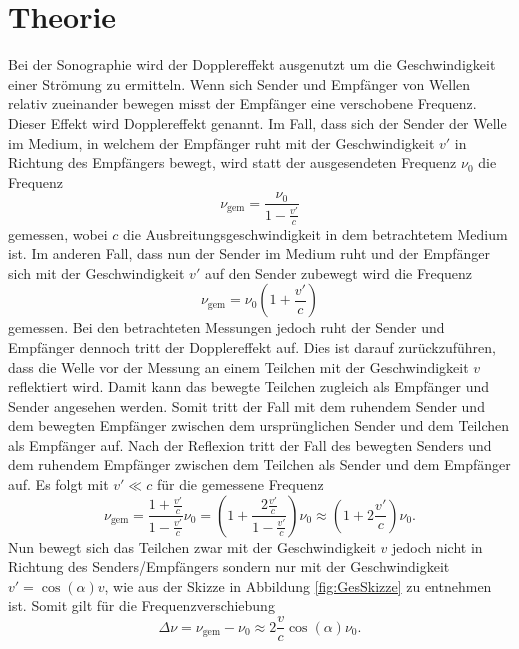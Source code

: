 
\section{Theorie}
\label{sec:Theorie}

Bei der Sonographie wird der Dopplereffekt ausgenutzt um die Geschwindigkeit einer Strömung zu ermitteln.
Wenn sich Sender und Empfänger von Wellen relativ zueinander bewegen misst der Empfänger eine verschobene Frequenz. Dieser Effekt wird Dopplereffekt genannt. Im Fall, dass sich der Sender der Welle im Medium, in welchem der Empfänger ruht mit der Geschwindigkeit $v'$ in Richtung des Empfängers bewegt, wird statt der ausgesendeten Frequenz $\nu_0$ die Frequenz
\begin{equation}
	\nu_\text{gem}=\frac{\nu_0}{1-\frac{v'}{c}}
\end{equation}
gemessen, wobei $c$ die Ausbreitungsgeschwindigkeit in dem betrachtetem Medium ist. Im anderen Fall, dass nun der Sender im Medium ruht und der Empfänger sich mit der Geschwindigkeit $v'$ auf den Sender zubewegt wird die Frequenz
\begin{equation}
	\nu_\text{gem}=\nu_0(1+\frac{v'}{c})
\end{equation}
gemessen. Bei den betrachteten Messungen jedoch ruht der Sender und Empfänger dennoch tritt der Dopplereffekt auf. Dies ist darauf zurückzuführen, dass die Welle vor der Messung an einem Teilchen mit der Geschwindigkeit $v$ reflektiert wird. Damit kann das bewegte Teilchen zugleich als Empfänger und Sender angesehen werden. Somit tritt der Fall mit dem ruhendem Sender und dem bewegten Empfänger zwischen dem ursprünglichen Sender und dem Teilchen als Empfänger auf. Nach der Reflexion tritt der Fall des bewegten Senders und dem ruhendem Empfänger zwischen dem Teilchen als Sender und dem Empfänger auf. Es folgt mit $v' \ll c$ für die gemessene Frequenz
\begin{equation}
	\nu_\text{gem}=\frac{1+\frac{v'}{c}}{1-\frac{v'}{c}} \nu_0=\left(1+\frac{2\frac{v'}{c}}{1-\frac{v'}{c}}\right) \nu_0\approx \left(1+2\frac{v'}{c}\right) \nu_0 \text{.}
\end{equation}
Nun bewegt sich das Teilchen zwar mit der Geschwindigkeit $v$ jedoch nicht in Richtung des Senders/Empfängers sondern nur mit der Geschwindigkeit $v'= \cos(\alpha) v$, wie aus der Skizze in Abbildung \ref{fig:GesSkizze} zu entnehmen ist. Somit gilt für die Frequenzverschiebung
\begin{equation}
	\Delta \nu = \nu_\text{gem}-\nu_0 \approx 2 \frac{v}{c} \cos(\alpha) \nu_0 \text{.}\label{eq:deltaf}
\end{equation}
